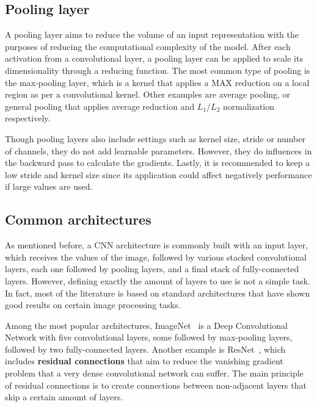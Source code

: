 \subsection{Pooling layer}
\label{appendix:neuralNetworks/cnn/poolLayer}
A pooling layer aims to reduce the volume of an input representation with the purposes of 
reducing the computational complexity of the model. After each activation from a convolutional 
layer, a pooling layer can be applied to scale its dimensionality through a reducing function. 
The most common type of pooling is the max-pooling layer, which is a kernel that applies a 
MAX reduction on a local region as per a convolutional kernel. Other examples are average 
pooling, or general pooling that applies average reduction and $L_1$/$L_2$ normalization 
respectively.

Though pooling layers also include settings such as kernel size, stride or number of channels, 
they do not add learnable parameters. However, they do influences in the backward pass to 
calculate the gradients. Lastly, it is recommended to keep a low stride and kernel size since 
its application could affect negatively performance if large values are used.

\subsection{Common architectures}
\label{appendix:neuralNetworks/cnn/architectures}
As mentioned before, a CNN architecture is commonly built with an input layer, which receives 
the values of the image, followed by various stacked convolutional layers, each one followed 
by pooling layers, and a final stack of fully-connected layers. However, defining exactly the 
amount of layers to use is not a simple task. In fact, most of the literature is based on 
standard architectures that have shown good results on certain image processing tasks.

Among the most popular architectures, ImageNet~\cite{appendix:KrizhevskySH12} is a Deep 
Convolutional Network with five convolutional layers, some followed by max-pooling layers, 
followed by two fully-connected layers. Another example is ResNet~\cite{appendix:HeZRS16}, 
which includes \textbf{residual connections} that aim to reduce the vanishing gradient 
problem that a very dense convolutional network can suffer. The main principle of residual 
connections is to create connections between non-adjacent layers that skip a certain 
amount of layers.